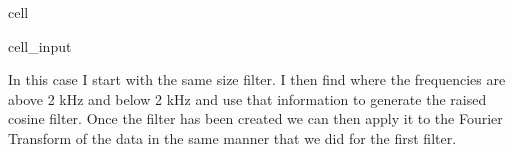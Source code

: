 \documentclass[letterpaper,10pt,english]{jupyterBook}
\begin{document}
\begin{sphinxuseclass}{cell}\begin{sphinxVerbatimInput}

\begin{sphinxuseclass}{cell_input}
\begin{sphinxVerbatim}[commandchars=\\\{\}]
  
    \PYG{p}{[}\PYG{p}{]}\PYG{p}{[}\PYG{p}{]}
    \PYG{p}{[}\PYG{p}{]}\PYG{p}{[}\PYG{p}{]}

  \PYG{p}{[}\PYG{p}{]}
        
\PYG{p}{[}\PYG{p}{]}    
\end{sphinxVerbatim}

\end{sphinxuseclass}\end{sphinxVerbatimInput}

\end{sphinxuseclass}
\sphinxAtStartPar
In this case I start with the same size filter. I then find where the frequencies are above \sphinxhyphen{}2 kHz and below 2 kHz and use that information to generate the raised cosine filter. Once the filter has been created we can then apply it to the Fourier Transform of the data in the same manner that we did for the first filter.
\end{document}
